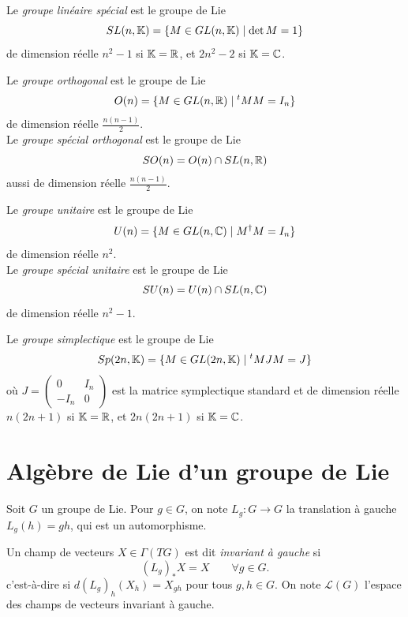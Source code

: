 \begin{definition}
    Le \emph{groupe linéaire spécial} est le groupe de Lie
    $$SL(n, \mathbb{K}) = \{ M \in GL(n, \mathbb{K}) \mid \det M = 1 \}$$
    de dimension réelle $n^2 - 1$ si $\mathbb{K} = \mathbb{R}$, et $2n^2 - 2$ si
  $\mathbb{K} = \mathbb{C}$.
\end{definition}

\begin{definition}
    Le \emph{groupe orthogonal} est le groupe de Lie
    $$O(n) = \{ M \in GL(n, \mathbb{R}) \mid {}^tM M = I_n \}$$
    de dimension réelle $\frac{n(n-1)}{2}$. \\
    Le \emph{groupe spécial orthogonal} est le groupe de Lie 
    $$SO(n) = O(n) \cap SL(n, \mathbb{R})$$ aussi de dimension réelle $\frac{n(n-1)}{2}$.
\end{definition}

\begin{definition}
    Le \emph{groupe unitaire} est le groupe de Lie
    $$U(n) = \{ M \in GL(n, \mathbb{C}) \mid M^\dagger M = I_n \}$$
    de dimension réelle $n^2$. \\
    Le \emph{groupe spécial unitaire} est le groupe de Lie 
    $$SU(n) = U(n) \cap SL(n, \mathbb{C})$$ de dimension réelle $n^2 - 1$.
\end{definition}

\begin{definition}
    Le \emph{groupe simplectique} est le groupe de Lie
    $$Sp(2n, \mathbb{K}) = \{ M \in GL(2n, \mathbb{K}) \mid {}^tMJM=J \}$$
    où $J = \begin{pmatrix} 0 & I_n \\ -I_n & 0 \end{pmatrix}$ est la matrice symplectique standard et de dimension réelle $n(2n+1)$ si $\mathbb{K} = \mathbb{R}$, et $2n(2n+1)$ si
  $\mathbb{K} = \mathbb{C}$.
\end{definition}

\section{Algèbre de Lie d'un groupe de Lie}

\noindent Soit $G$ un groupe de Lie. Pour $g \in G$, on note $L_g : G \to G$ la translation à gauche $L_g(h) = gh$, qui est un automorphisme.

\begin{definition}
  Un champ de vecteurs $X \in \Gamma(TG)$ est dit
  \emph{invariant à gauche} si
  $$(L_g)_* X = X \qquad \forall g \in G.$$
  c'est-à-dire si $d(L_g)_h(X_h) = X_{gh}$ pour tous $g, h \in G$.
  On note $\mathcal{L}(G)$ l'espace des champs de vecteurs invariant à gauche.
\end{definition}

